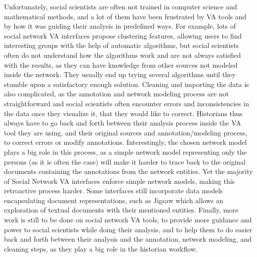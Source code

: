 Unfortunately, social scientists are often not trained in computer science and mathematical methods, and a lot of them have been frustrated by VA tools and by how it was guiding their analysis in predefined ways.
For example, lots of social network VA interfaces propose clustering features, allowing users to find interesting groups with the help of automatic algorithms, but social scientists often do not understand how the algorithms work and are not always satisfied with the results, as they can have knowledge from other sources not modeled inside the network.
They usually end up trying several algorithms until they stumble upon a satisfactory enough solution.
Cleaning and importing the data is also complicated, as the annotation and network modeling process are not straightforward and social scientists often encounter errors and inconsistencies in the data once they visualize it, that they would like to correct.
Historians thus always have to go back and forth between their analysis process inside the VA tool they are using, and their original sources and annotation/modeling process, to correct errors or modify annotations.
Interestingly, the chosen network model plays a big role in this process, as a simple network model representing only the persons (as it is often the case) will make it harder to trace back to the original documents containing the annotations from the network entities.
Yet the majority of Social Network VA interfaces enforce simple network models, making this retroactive process harder.
Some interfaces still incorporate data models encapsulating document representations, such as Jigsaw \cite{staskoJigsawSupportingInvestigative2008} which allows an exploration of textual documents with their mentioned entities.
Finally, more work is still to be done on social network VA tools, to provide more guidance and power to social scientists while doing their analysis, and to help them to do easier back and forth between their analysis and the annotation, network modeling, and cleaning steps, as they play a big role in the historian workflow.




